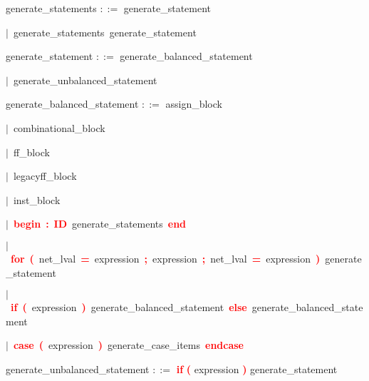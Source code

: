 \vspace{1em}
\noindent
\settowidth{\parindent}{\hspace{4ex}}
generate\_statements $::=$\hspace{1ex} generate\_statement

\mbox{$|$ generate\_statements generate\_statement}

\vspace{1em}
\noindent
\settowidth{\parindent}{\hspace{4ex}}
generate\_statement $::=$\hspace{1ex} generate\_balanced\_statement

\mbox{$|$ generate\_unbalanced\_statement}

\vspace{1em}
\noindent
\settowidth{\parindent}{\hspace{4ex}}
generate\_balanced\_statement $::=$\hspace{1ex} assign\_block

\mbox{$|$ combinational\_block}

\mbox{$|$ ff\_block}

\mbox{$|$ legacyff\_block}

\mbox{$|$ inst\_block}

\mbox{$|$ \textbf{\textcolor{red}{begin}} \textbf{\textcolor{red}{:}} \textbf{\textcolor{red}{ID}} generate\_statements \textbf{\textcolor{red}{end}}}

\mbox{$|$ \textbf{\textcolor{red}{for}} \textbf{\textcolor{red}{(}} net\_lval \textbf{\textcolor{red}{=}} expression \textbf{\textcolor{red}{;}} expression \textbf{\textcolor{red}{;}} net\_lval \textbf{\textcolor{red}{=}} expression \textbf{\textcolor{red}{)}} generate\_statement}

\mbox{$|$ \textbf{\textcolor{red}{if}} \textbf{\textcolor{red}{(}} expression \textbf{\textcolor{red}{)}} generate\_balanced\_statement \textbf{\textcolor{red}{else}} generate\_balanced\_statement}

\mbox{$|$ \textbf{\textcolor{red}{case}} \textbf{\textcolor{red}{(}} expression \textbf{\textcolor{red}{)}} generate\_case\_items \textbf{\textcolor{red}{endcase}}}

\vspace{1em}
\noindent
\settowidth{\parindent}{\hspace{4ex}}
generate\_unbalanced\_statement $::=$\hspace{1ex} \textbf{\textcolor{red}{if}} \textbf{\textcolor{red}{(}} expression \textbf{\textcolor{red}{)}} generate\_statement

